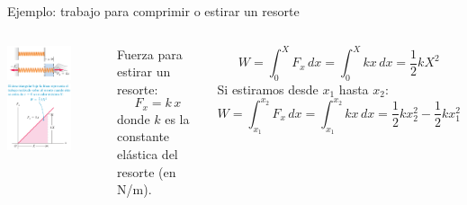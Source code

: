 \documentclass[9pt, aspectratio=169]{beamer}
\begin{document}
\begin{frame}{Ejemplo: trabajo para comprimir o estirar un resorte}
\begin{columns}
    \begin{center}
        \includegraphics[width=0.7\textwidth]{figs/fig-07.png} \\
        \includegraphics[width=0.7\textwidth]{figs/fig-08.png} 
    \end{center}
    Fuerza para estirar un resorte:
    \[ F_x = k \, x \]
    donde $k$ es la constante elástica del resorte (en \unit{N/m}).

    \[ W = \int_0^X F_x \, dx = \int_0^X kx \, dx = \frac{1}{2} k X^2 \]
    Si estiramos desde $x_1$ hasta $x_2$:
    \[ W = \int_{x_1}^{x_2} F_x \, dx = \int_{x_1}^{x_2} kx \, dx = \frac{1}{2} k x_2^2 - \frac{1}{2} k x_1^2 \]
\end{columns}
\end{frame}
\end{document}
